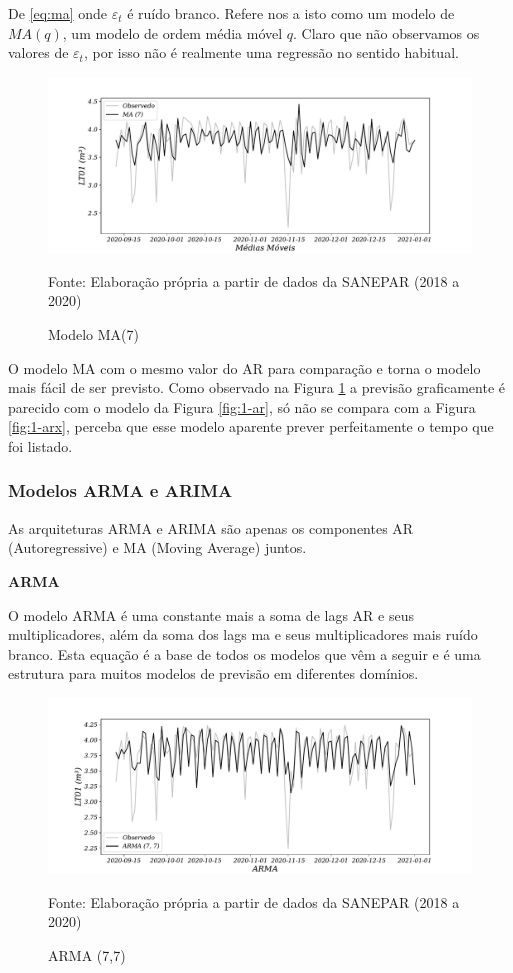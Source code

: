 De \eqref{eq:ma} onde $\varepsilon_t$ é ruído branco. Refere nos a isto como um modelo de $MA(q)$, um modelo de ordem média móvel $q$. Claro que não observamos os valores de $\varepsilon_t$, por isso não é realmente uma regressão no sentido habitual.

\begin{figure}[H]
	\centering
	\caption{Modelo MA(7) }
	\label{fig:1-ma}
	\includegraphics[width=1\linewidth]{Modelos/Figuras/1-MA}
	
	Fonte: Elaboração própria a partir de dados da SANEPAR (2018 a 2020)
\end{figure}

O modelo MA com o mesmo valor do AR para comparação e torna o modelo mais fácil de ser previsto. Como observado na Figura \ref{fig:1-ma} a previsão graficamente é parecido com o modelo da Figura \ref{fig:1-ar}, só não se compara com a Figura \ref{fig:1-arx}, perceba que esse modelo aparente prever perfeitamente o tempo que foi listado.  

\subsubsection{Modelos ARMA e ARIMA}\label{subsubsec:arma}
As arquiteturas ARMA e ARIMA são apenas os componentes AR (Autoregressive) e MA (Moving Average) juntos.

\textbf{ARMA}

O modelo ARMA é uma constante mais a soma de lags AR e seus multiplicadores, além da soma dos lags ma e seus multiplicadores mais ruído branco. Esta equação é a base de todos os modelos que vêm a seguir e é uma estrutura para muitos modelos de previsão em diferentes domínios.

\begin{figure}[H]
	\centering
	\caption{ARMA (7,7)  }
	\label{fig:1-arma}
	\includegraphics[width=1\linewidth]{Modelos/Figuras/1-ARMA}
	
	Fonte: Elaboração própria a partir de dados da SANEPAR (2018 a 2020)
\end{figure}

